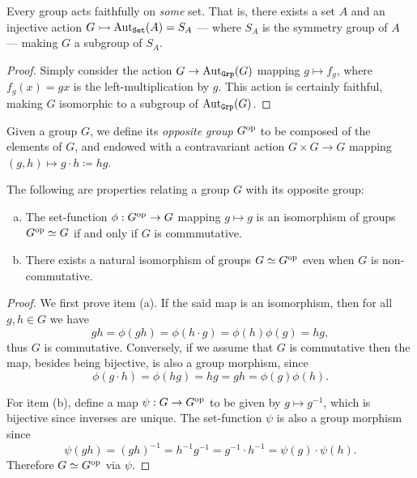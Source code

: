 \begin{theorem}[Cayley]
\label{thm:cayley-faithful}
Every group acts faithfully on \emph{some} set. That is, there exists a set
\(A\) and an injective action \(G \rightarrowtail \operatorname{Aut}_{{\texttt{Set}}}(A) = S_A\) --- where \(S_A\)
is the symmetry group of \(A\) --- making \(G\) a subgroup of \(S_A\).
\end{theorem}

\begin{proof}
Simply consider the action \(G \to \operatorname{Aut}_{{\texttt{Grp}}}(G)\) mapping \(g \mapsto f_g\),
where \(f_g(x) = g x\) is the left-multiplication by \(g\). This action is
certainly faithful, making \(G\) isomorphic to a subgroup of \(\operatorname{Aut}_{{\texttt{Grp}}}(G)\).
\end{proof}

\begin{definition}
\label{def:opposite-group}
Given a group \(G\), we define its \emph{opposite group} \(G^{\mathrm{op}}\) to be
composed of the elements of \(G\), and endowed with a contravariant action \(G
\times G \to G\) mapping \((g, h) \mapsto g \cdot h \coloneq h g\).
\end{definition}

\begin{corollary}
\label{cor:Gop-iso-G-id-iff-commutative}
The following are properties relating a group \(G\) with its opposite group:
\begin{enumerate}[(a)]\setlength\itemsep{0em}
\item The set-function \(\phi: G^{\mathrm{op}} \to G\) mapping \(g \mapsto g\) is an
  isomorphism of groups \(G^{\mathrm{op}} \simeq G\) if and only if \(G\) is commmutative.

\item There exists a natural isomorphism of groups \(G \simeq G^{\mathrm{op}}\) even when
  \(G\) is non-commutative.
\end{enumerate}
\end{corollary}

\begin{proof}
We first prove item (a). If the said map is an isomorphism, then for all
\(g, h \in G\) we have
\[
g h = \phi(g h) = \phi(h \cdot g) = \phi(h) \phi(g) = h g,
\]
thus \(G\) is commutative. Conversely, if we assume that \(G\) is commutative
then the map, besides being bijective, is also a group morphism, since
\[
\phi(g \cdot h) = \phi(h g) = h g = g h = \phi(g) \phi(h).
\]

For item (b), define a map \(\psi: G \to G^{\mathrm{op}}\) to be given by
\(g \mapsto g^{-1}\), which is bijective since inverses are unique. The
set-function \(\psi\) is also a group morphism since
\[
\psi(g h) = (g h)^{-1} = h^{-1} g^{-1}
= g^{-1} \cdot h^{-1} = \psi(g) \cdot \psi(h).
\]
Therefore \(G \simeq G^{\mathrm{op}}\) via \(\psi\).
\end{proof}

